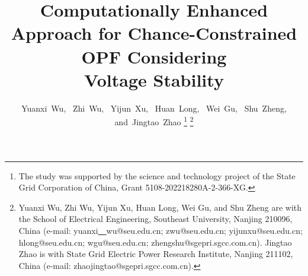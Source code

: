 \documentclass[journal]{IEEEtran}
\theoremstyle{definition}
\theoremstyle{remark}
\begin{document}
%
\title{Computationally Enhanced Approach for Chance-Constrained OPF Considering \\Voltage Stability}
%
%
%

\author{Yuanxi~Wu,~
        Zhi~Wu,~
        Yijun~Xu,~
        Huan~Long,~
        Wei~Gu,~
        Shu~Zheng,
        and~Jingtao~Zhao%
        \thanks{The study was supported by the science and technology project of the State Grid Corporation of China, Grant 5108-202218280A-2-366-XG.}
\thanks{Yuanxi Wu, Zhi Wu, Yijun Xu, Huan Long, Wei Gu, and Shu Zheng are with the School
of Electrical Engineering, Southeast University, Nanjing 210096, China (e-mail: yuanxi\underline{~~}wu@seu.edu.cn; zwu@seu.edu.cn; yijunxu@seu.edu.cn; hlong@seu.edu.cn; wgu@seu.edu.cn; zhengshu@sgepri.sgcc.com.cn). Jingtao Zhao is with State Grid Electric Power Research Institute, Nanjing 211102, China (e-mail: zhaojingtao@sgepri.sgcc.com.cn).}%
}

% 
%
\end{document}
